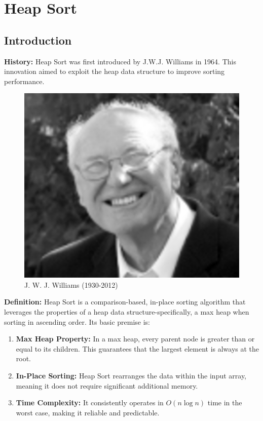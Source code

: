 \section{Heap Sort}

\subsection{Introduction}
\textbf{History:} Heap Sort was first introduced by J.W.J. Williams in 1964. This innovation aimed to exploit the heap data structure to improve sorting performance.

\begin{figure}[H]
\centering
\includegraphics[scale=.3]{img/jwjWilliams.jpg}
\caption{J. W. J. Williams (1930-2012)}
\label{fig:jwj_williams}
\end{figure}

\textbf{Definition:} Heap Sort is a comparison-based, in-place sorting algorithm that leverages the properties of a heap data structure-specifically, a max heap when sorting in ascending order. Its basic premise is:
\begin{enumerate}
    \item \textbf{Max Heap Property:} In a max heap, every parent node is greater than or equal to its children. This guarantees that the largest element is always at the root.
    \item \textbf{In-Place Sorting:} Heap Sort rearranges the data within the input array, meaning it does not require significant additional memory.
    \item \textbf{Time Complexity:} It consistently operates in $O(n \log n)$ time in the worst case, making it reliable and predictable.
\end{enumerate}

